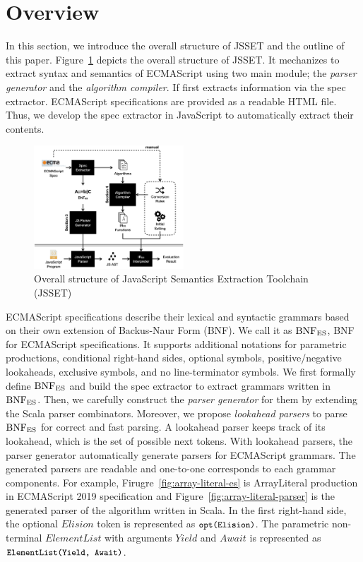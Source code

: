 \section{Overview}

In this section, we introduce the overall structure of JSSET and the outline of
this paper. Figure~\ref{fig:overview} depicts the overall structure of JSSET.
It mechanizes to extract syntax and semantics of ECMAScript using
two main module; the \textit{parser generator} and the \textit{algorithm compiler}.
If first extracts information via the spec extractor.
ECMAScript specifications are provided as a readable HTML file.
Thus, we develop the spec extractor in JavaScript to automatically
extract their contents.

\begin{figure}
  \centering
  \includegraphics[width=0.5\textwidth]{img/overview.png}
  \caption{Overall structure of JavaScript Semantics Extraction Toolchain (JSSET)}
  \label{fig:overview}
\end{figure}

ECMAScript specifications describe their lexical and syntactic grammars
based on their own extension of Backus-Naur Form (BNF).
We call it as \( \text{BNF}_{\text{ES}} \), BNF for ECMAScript specifications.
It supports additional notations for parametric productions, conditional
right-hand sides, optional symbols, positive/negative lookaheads,
exclusive symbols, and no line-terminator symbols. We first formally define
\( \text{BNF}_{\text{ES}} \) and build the spec extractor to extract grammars written in \( \text{BNF}_{\text{ES}} \).
Then, we carefully construct the \textit{parser generator} for them by extending
the Scala parser combinators. Moreover, we propose \textit{lookahead parsers}
to parse \( \text{BNF}_{\text{ES}} \) for correct and fast parsing.
A lookahead parser keeps track of its lookahead, which is the set of
possible next tokens. With lookahead parsers,
the parser generator automatically generate parsers for ECMAScript grammars.
The generated parsers are readable and one-to-one corresponds to each
grammar components.
For example, Firugre~\ref{fig:array-literal-es} is ArrayLiteral production in
ECMAScript 2019 specification and Figure~\ref{fig:array-literal-parser}
is the generated parser of the algorithm written in Scala.
In the first right-hand side, the optional \( Elision \) token
is represented as \( \texttt{\small opt(Elision)} \).
The parametric non-terminal \( ElementList \) with arguments \( Yield \)
and \( Await \) is represented as \( \texttt{\small ElementList(Yield, Await)} \).

